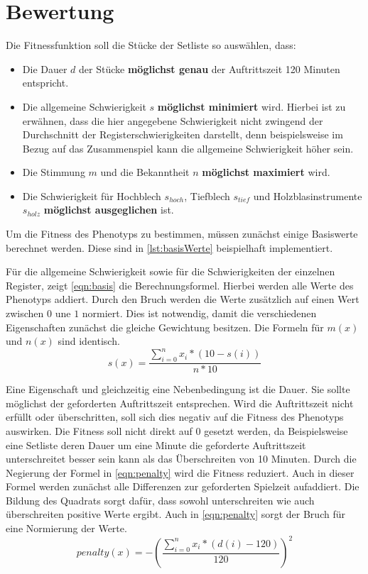 \section{Bewertung}\label{sec:fitness}
Die Fitnessfunktion soll die Stücke der Setliste so auswählen, dass:
\begin{itemize}
    \item Die Dauer $d$ der Stücke \textbf{möglichst genau} der Auftrittszeit 120 Minuten entspricht.
    \item Die allgemeine Schwierigkeit $s$ \textbf{möglichst minimiert} wird. Hierbei ist zu erwähnen, dass die hier
        angegebene Schwierigkeit nicht zwingend der Durchschnitt der Registerschwierigkeiten darstellt, denn
        beispielsweise im Bezug auf das Zusammenspiel kann die allgemeine Schwierigkeit höher sein.
    \item Die Stimmung $m$ und die Bekanntheit $n$ \textbf{möglichst maximiert} wird.
    \item Die Schwierigkeit für Hochblech $s_{hoch}$, Tiefblech $s_{tief}$ und Holzblasinstrumente $s_{holz}$ \textbf{möglichst ausgeglichen} ist.
\end{itemize}
Um die Fitness des Phenotyps zu bestimmen, müssen zunächst einige Basiswerte berechnet werden. Diese sind in \autoref{lst:basisWerte} beispielhaft implementiert.

Für die allgemeine Schwierigkeit sowie für die Schwierigkeiten der einzelnen Register, zeigt \autoref{eqn:basis} die Berechnungsformel. Hierbei werden alle Werte des
Phenotyps addiert. Durch den Bruch werden die Werte zusätzlich auf einen Wert zwischen $0$ une $1$ normiert. Dies ist notwendig, 
damit die verschiedenen Eigenschaften zunächst die gleiche Gewichtung besitzen. 
Die Formeln für $m(x)$ und $n(x)$ sind identisch.
\begin{equation}
    s(x) = \frac{\sum_{i=0}^{n} x_i * (10 - s(i)) }{n * 10}
    \label{eqn:basis}
\end{equation}

Eine Eigenschaft und gleichzeitig eine Nebenbedingung ist die Dauer. Sie sollte möglichst der geforderten Auftrittszeit entsprechen. Wird die Auftrittszeit nicht erfüllt
oder überschritten, soll sich dies negativ auf die Fitness des Phenotyps auswirken. Die Fitness soll nicht direkt auf 0 gesetzt werden, da
Beispielsweise eine Setliste deren Dauer um eine Minute die geforderte Auftrittszeit unterschreitet besser sein kann als das Überschreiten von 10 Minuten.
Durch die Negierung der Formel in \autoref{eqn:penalty} wird die Fitness reduziert. Auch in dieser Formel werden zunächst alle Differenzen zur geforderten
Spielzeit aufaddiert. Die Bildung des Quadrats sorgt dafür, dass sowohl unterschreiten wie auch überschreiten
positive Werte ergibt.
Auch in \autoref{eqn:penalty} sorgt der Bruch für eine Normierung der Werte.
\begin{equation}
    penalty(x) = -\left( \frac{\sum_{i=0}^{n}x_i * (d(i)-120)}{120}\right)^2
    \label{eqn:penalty}
\end{equation}

